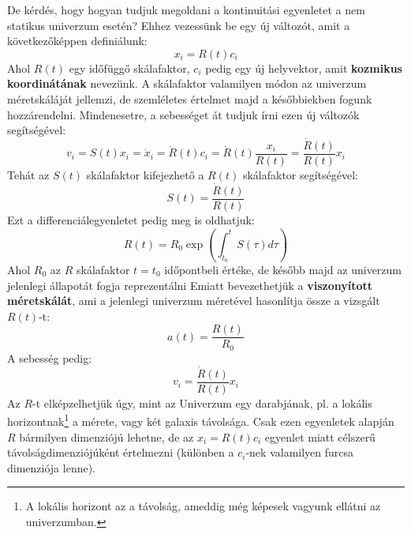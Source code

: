 \documentclass[../main.tex]{subfiles}
\begin{document}
De kérdés, hogy hogyan tudjuk megoldani a kontinuitási egyenletet a nem statikus univerzum esetén? Ehhez vezessünk be egy új változót, amit a következőképpen definiálunk:
\begin{equation}
    x_i = R(t) c_i
\end{equation}
Ahol $R(t)$ egy időfüggő skálafaktor, $c_i$ pedig egy új helyvektor, amit \textbf{kozmikus koordinátának} nevezünk. A skálafaktor valamilyen módon az univerzum méretskáláját jellemzi, de szemléletes értelmet
majd a későbbiekben fogunk hozzárendelni. Mindenesetre, a sebességet át tudjuk írni ezen új változók segítségével:
\begin{equation}
    v_i = S(t) x_i = \dot{x}_i = \dot{R}(t) c_i = \dot{R}(t) \frac{x_i}{R(t)} = \frac{\dot{R}(t)}{R(t)} x_i
\end{equation}
Tehát az $S(t)$ skálafaktor kifejezhető a $R(t)$ skálafaktor segítségével:
\begin{equation}
    S(t) = \frac{\dot{R}(t)}{R(t)}
\end{equation}
Ezt a differenciálegyenletet pedig meg is oldhatjuk:
\begin{equation}
    R(t) = R_0 \exp\left(\int_{t_0}^t S(\tau) d \tau\right)
\end{equation}
Ahol $R_0$ az $R$ skálafaktor $t = t_0$ időpontbeli értéke, de később majd az univerzum jelenlegi állapotát fogja reprezentálni Emiatt bevezethetjük a \textbf{viszonyított méretskálát}, ami a jelenlegi
univerzum méretével hasonlítja össze a vizsgált $R(t)$-t:
\begin{equation}
    a(t) = \frac{R(t)}{R_0}
\end{equation}
A sebesség pedig:
\begin{equation}
    v_i = \frac{\dot{R}(t)}{R(t)} x_i
\end{equation}
Az $R$-t elképzelhetjük úgy, mint az Univerzum egy darabjának, pl. a lokális horizontnak\footnote{
    A lokális horizont az a távolság, ameddig még képesek vagyunk ellátni az univerzumban.
} a mérete, vagy két galaxis távolsága. Csak ezen egyenletek alapján $R$ bármilyen dimenziójú lehetne, de az $x_i = R(t) c_i$ egyenlet miatt célszerű távolságdimenziójúként értelmezni (különben a $c_i$-nek valamilyen furcsa dimenziója lenne).
\end{document}
